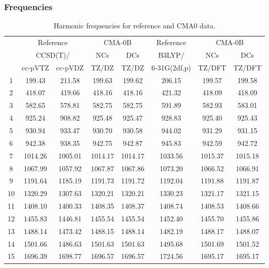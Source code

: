\documentclass[10pt,oneside]{article}
\begin{document}
\subsubsection*{Frequencies}
\begin{table}[h!]
\centering
\caption{Harmonic frequencies for reference and CMA0 data.}
\begin{tabular}{cccccccc}
\toprule
{} & \multicolumn{2}{c}{Reference} & \multicolumn{2}{c}{CMA-0B} &    Reference & \multicolumn{2}{c}{CMA-0B} \\
{} & \multicolumn{2}{c}{CCSD(T)/} &     NCs &     DCs &       B3LYP/ &     NCs &     DCs \\
{} &   cc-pVTZ & cc-pVDZ &   TZ/DZ &   TZ/DZ & 6-31G(2df,p) &  TZ/DFT &  TZ/DFT \\
\midrule
1  &    199.43 &  211.58 &  199.63 &  199.62 &       206.15 &  199.57 &  199.58 \\
2  &    418.07 &  419.66 &  418.16 &  418.16 &       421.32 &  418.09 &  418.09 \\
3  &    582.65 &  578.81 &  582.75 &  582.75 &       591.89 &  582.93 &  583.01 \\
4  &    925.24 &  908.82 &  925.48 &  925.47 &       928.83 &  925.40 &  925.43 \\
5  &    930.94 &  933.47 &  930.70 &  930.58 &       944.02 &  931.29 &  931.15 \\
6  &    942.38 &  938.35 &  942.75 &  942.87 &       945.83 &  942.59 &  942.72 \\
7  &   1014.26 & 1005.01 & 1014.17 & 1014.17 &      1033.56 & 1015.37 & 1015.18 \\
8  &   1067.99 & 1057.92 & 1067.87 & 1067.86 &      1073.20 & 1066.52 & 1066.91 \\
9  &   1191.64 & 1185.19 & 1191.73 & 1191.72 &      1192.04 & 1191.88 & 1191.87 \\
10 &   1320.29 & 1307.63 & 1320.21 & 1320.21 &      1330.23 & 1321.17 & 1321.15 \\
11 &   1408.10 & 1400.33 & 1408.35 & 1408.37 &      1408.74 & 1408.53 & 1408.66 \\
12 &   1455.83 & 1446.81 & 1455.54 & 1455.54 &      1452.40 & 1455.70 & 1455.86 \\
13 &   1488.14 & 1473.42 & 1488.15 & 1488.14 &      1482.19 & 1488.17 & 1488.07 \\
14 &   1501.66 & 1486.63 & 1501.63 & 1501.63 &      1495.68 & 1501.69 & 1501.52 \\
15 &   1696.39 & 1698.77 & 1696.57 & 1696.57 &      1724.56 & 1695.17 & 1695.17 \\

\end{tabular}
\end{table}
\end{document}
